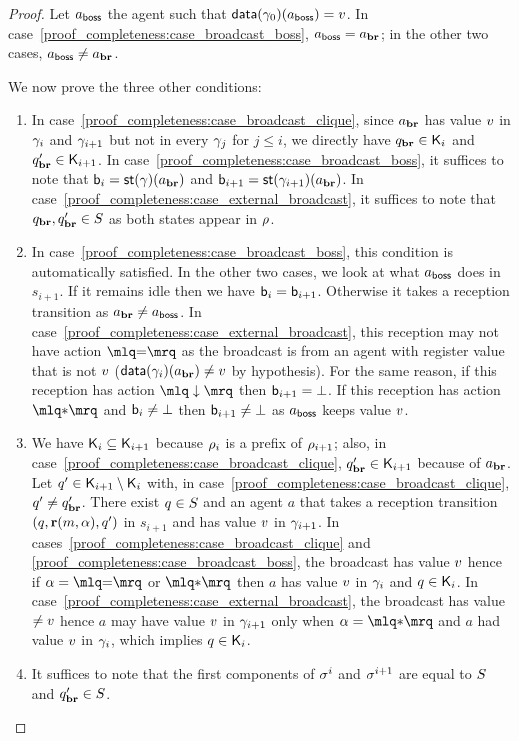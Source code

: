 \begin{proof}
Let $a_{\mathsf{boss}}$ the agent such that $\mathsf{data}(\gamma_0)(a_{\mathsf{boss}}) = v$. In case~\ref{proof_completeness:case_broadcast_boss}, $a_{\mathsf{boss}} = a_{\textbf{br}}$; in the other two cases, $a_{\mathsf{boss}} \ne a_{\textbf{br}}$. 

We now prove the three other conditions:
\begin{enumerate}[label = (\roman*)]
\item In case~\ref{proof_completeness:case_broadcast_clique}, since $a_{\textbf{br}}$ has value $v$ in $\gamma_i$ and $\gamma_{i+1}$ but not in every $\gamma_j$ for $j \leq i$, we directly have $q_{\textbf{br}} \in \mathsf{K}_i$ and $q_{\textbf{br}}' \in \mathsf{K}_{i+1}$. In case~\ref{proof_completeness:case_broadcast_boss}, it suffices to note that $\mathsf{b}_i = \mathsf{st}(\gamma)(a_{\textbf{br}})$ and $\mathsf{b}_{i+1} = \mathsf{st}(\gamma_{i+1})(a_{\textbf{br}})$. In case~\ref{proof_completeness:case_external_broadcast}, it suffices to note that $q_{\textbf{br}}, q_{\textbf{br}}' \in S$ as both states appear in $\rho$.
\item In case~\ref{proof_completeness:case_broadcast_boss}, this condition is automatically satisfied. In the other two cases, we look at what $a_{\mathsf{boss}}$ does in $s_{i+1}$. If it remains idle then we have $\mathsf{b}_i = \mathsf{b}_{i+1}$. Otherwise it takes a reception transition as $a_{\textbf{br}} \ne a_{\mathsf{boss}}$. 
In case~\ref{proof_completeness:case_external_broadcast}, this reception may not have action $\quotemarks{\eqtestact}$ as the broadcast is from an agent with register value that is not $v$ ($\mathsf{data}(\gamma_i)(a_{\textbf{br}}) \ne v$ by hypothesis). For the same reason, if this reception has action $\quotemarks{\enregact}$ then $\mathsf{b}_{i+1}= \bot$. If this reception has action $\quotemarks{\dummyact}$ and $\mathsf{b}_i \ne \bot$ then $\mathsf{b}_{i+1} \ne \bot$ as $a_{\mathsf{boss}}$ keeps value $v$.
\item We have $\mathsf{K}_i \subseteq \mathsf{K}_{i+1}$ because $\rho_{i}$ is a prefix of $\rho_{i+1}$; also, in case~\ref{proof_completeness:case_broadcast_clique}, $q_{\textbf{br}}' \in \mathsf{K}_{i+1}$ because of $a_{\textbf{br}}$. Let $q' \in \mathsf{K}_{i+1} \setminus \mathsf{K}_i$ with, in case~\ref{proof_completeness:case_broadcast_clique}, $q' \ne q_{\textbf{br}}'$. There exist $q\in S$ and an agent $a$ that takes a reception transition $(q, \textbf{r}(m, \alpha), q')$ in $s_{i+1}$ and has value $v$ in $\gamma_{i+1}$. In cases~\ref{proof_completeness:case_broadcast_clique} and \ref{proof_completeness:case_broadcast_boss}, the broadcast has value $v$ hence if $\anact = \quotemarks{\eqtestact}$ or $\quotemarks{\dummyact}$ then $a$ has value $v$ in $\gamma_i$ and $q \in \mathsf{K}_i$. In case~\ref{proof_completeness:case_external_broadcast}, the broadcast has value $\ne v$ hence $a$ may have value $v$ in $\gamma_{i+1}$ only when $\anact = \quotemarks{\dummyact}$ and $a$ had value $v$ in $\gamma_i$, which implies $q \in \mathsf{K}_i$. 
\item It suffices to note that the first components of $\sigma^i$ and $\sigma^{i+1}$ are equal to $S$ and $q_{\textbf{br}}' \in S$. 
\end{enumerate}


\end{proof}
